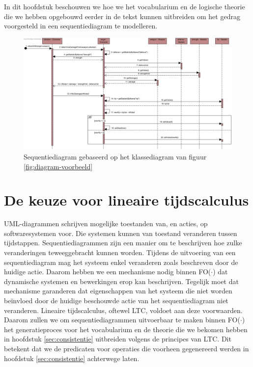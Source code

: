 In dit hoofdstuk beschouwen we hoe we het vocabularium en de logische theorie die we hebben opgebouwd eerder in de tekst kunnen uitbreiden om het gedrag voorgesteld in een sequentiediagram te modelleren.

\begin{landscape}
	\thispagestyle{empty}
\begin{figure}
	\includegraphics[width=1.5\textwidth]{chap-gedrag/seq-diagram-game.png}
	\caption{Sequentiediagram gebaseerd op het klassediagram van figuur \ref{fig:diagram-voorbeeld}}
	\label{fig:seq-diagram-game}
\end{figure}
\end{landscape}

\section{De keuze voor lineaire tijdscalculus}
UML-diagrammen schrijven mogelijke toestanden van, en acties, op softwaresystemen voor. Die systemen kunnen van toestand veranderen tussen tijdstappen. Sequentiediagrammen zijn een manier om te beschrijven hoe zulke veranderingen teweeggebracht kunnen worden. Tijdens de uitvoering van een sequentiediagram mag het systeem enkel veranderen zoals beschreven door de huidige actie. Daarom hebben we een mechanisme nodig binnen FO($\cdot$) dat dynamische systemen en bewerkingen erop kan beschrijven. Tegelijk moet dat mechanisme garanderen dat eigenschappen van het systeem die niet worden be\"invloed door de huidige beschouwde actie van het sequentiediagram niet veranderen. Lineaire tijdscalculus\cite{BogaertsBart2014Sdsu}, oftewel LTC, voldoet aan deze voorwaarden. Daarom zullen we om sequentiediagrammen uitvoerbaar te maken binnen FO($\cdot$) het generatieproces voor het vocabularium en de theorie die we bekomen hebben in hoofdstuk \ref{sec:consistentie} uitbreiden volgens de principes van LTC. Dit betekent dat we de predicaten voor operaties die voorheen gegenereerd werden in hoofdstuk \ref{sec:consistentie} achterwege laten.

